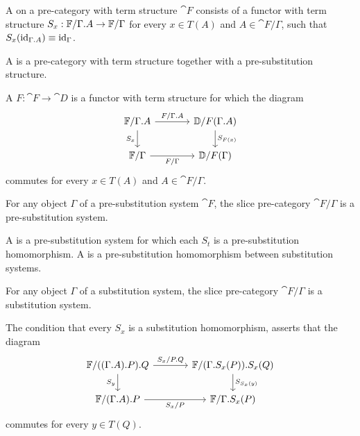 \begin{defn}
A  on a pre-category with term structure $\cat{F}$ consists
of a functor with term structure $S_x:\cat{F}/\ctxext{\Gamma}{A}\to\cat{F}/\Gamma$ for every $x\in T(A)$ and
$A\in\cat{F}/\Gamma$, such that $S_x(\catid{\ctxext{\Gamma}{A}})\jdeq\catid{\Gamma}$.

A  is a pre-category with term structure together with a
pre-substitution structure. 
\end{defn}

\begin{defn}
A  $F:\cat{F}\to\cat{D}$ is a functor with term structure for
which the diagram
\begin{equation*}
\begin{tikzcd}[column sep=large]
\cat{F}/\ctxext{\Gamma}{A}
  \arrow[r,"F/\ctxext{\Gamma}{A}"]
  \arrow[d,swap,"S_x"]
  &
\cat{D}/F(\ctxext{\Gamma}{A})
  \arrow[d,"S_{F(x)}"]
  \\
\cat{F}/\Gamma
  \arrow[r,swap,"F/\Gamma"]
  &
\cat{D}/F(\Gamma)
\end{tikzcd}
\end{equation*}
commutes for every $x\in T(A)$ and $A\in\cat{F}/\Gamma$.
\end{defn}

\begin{lem}
For any object $\Gamma$ of a pre-substitution system $\cat{F}$, the slice pre-category
$\cat{F}/\Gamma	$ is a pre-substitution system.
\end{lem}

\begin{defn}
A  is a pre-substitution system for which each
$S_t$ is a pre-substitution homomorphism. A  is a
pre-substitution homomorphism between substitution systems.
\end{defn}

\begin{cor}
For any object $\Gamma$ of a substitution system, the slice pre-category $\cat{F}/\Gamma$
is a substitution system.
\end{cor}

\begin{rmk}
The condition that every $S_x$ is a substitution homomorphism, asserts that
the diagram
\begin{equation*}
\begin{tikzcd}[column sep=large]
\cat{F}/\ctxext{{{\Gamma}{A}}{P}}{Q}
  \arrow[r,"S_x/\ctxext{P}{Q}"]
  \arrow[d,swap,"S_y"]
  &
\cat{F}/\ctxext{{\Gamma}{S_x(P)}}{S_x(Q)}
  \arrow[d,"S_{S_x(y)}"]
  \\
\cat{F}/\ctxext{{\Gamma}{A}}{P}
  \arrow[r,swap,"S_x/P"]
  &
\cat{F}/\ctxext{\Gamma}{S_x(P)}
\end{tikzcd}
\end{equation*}
commutes for every $y\in T(Q)$.
\end{rmk}

